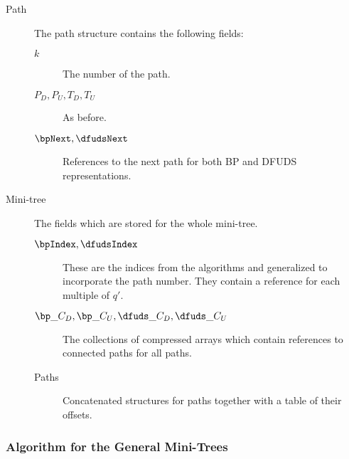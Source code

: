 \begin{description}
	\item[Path]
	The path structure contains the following fields:
	\begin{description}
		\item[$k$]
		The number of the path.
		
		\item[$P_D, P_U, T_D, T_U$]
		As before.
	
		\item[$\bpNext, \dfudsNext$]
		References to the next path for both BP and DFUDS representations.
	\end{description}
	
	\item[Mini-tree]
	The fields which are stored for the whole mini-tree.
	\begin{description}
		\item[$\bpIndex, \dfudsIndex$]
		These are the indices from the algorithms \bpSubstringSkinny{} and \dfudsSubstringSkinny{} generalized to incorporate the path number.
		They contain a reference for each multiple of $q'$.
		
		
		\item[$\bp\_C_D, \bp\_C_U, \dfuds\_C_D, \dfuds\_C_U$]
		The collections of compressed arrays which contain references to connected paths for all paths.
		
		\item[Paths]
		Concatenated structures for paths together with a table of their offsets.
	\end{description}
\end{description}

\subsubsection{Algorithm for the General Mini-Trees}

